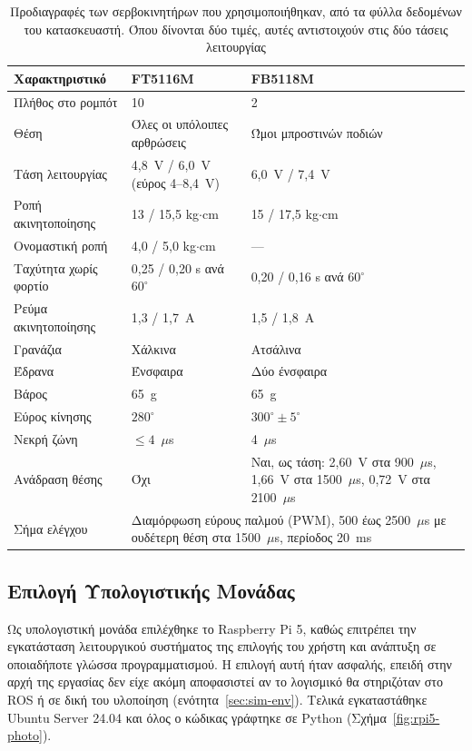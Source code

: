\documentclass[11pt]{report}
\begin{document}
\begin{table}[htbp]
    \centering
    \small
    \begin{tabular}{@{}p{4.3cm} p{4.4cm} p{4.4cm}@{}}
        \toprule
        Χαρακτηριστικό & FT5116M & FB5118M \\
        \midrule
        Πλήθος στο ρομπότ & 10 & 2 \\
        Θέση & Όλες οι υπόλοιπες αρθρώσεις & Ώμοι μπροστινών ποδιών \\
        Τάση λειτουργίας & 4,8~V / 6,0~V (εύρος 4--8,4~V) & 6,0~V / 7,4~V \\
        Ροπή ακινητοποίησης & 13 / 15,5 kg$\cdot$cm & 15 / 17,5 kg$\cdot$cm \\
        Ονομαστική ροπή & 4,0 / 5,0 kg$\cdot$cm & --- \\
        Ταχύτητα χωρίς φορτίο & 0,25 / 0,20 s ανά $60^\circ$ & 0,20 / 0,16 s ανά $60^\circ$ \\
        Ρεύμα ακινητοποίησης & 1,3 / 1,7~A & 1,5 / 1,8~A \\
        Γρανάζια & Χάλκινα & Ατσάλινα \\
        Έδρανα & Ένσφαιρα & Δύο ένσφαιρα \\
        Βάρος & 65~g & 65~g \\
        Εύρος κίνησης & $280^\circ$ & $300^\circ \pm 5^\circ$ \\
        Νεκρή ζώνη & $\leq 4$~$\mu$s & 4~$\mu$s \\
        Ανάδραση θέσης & Όχι & Ναι, ως τάση: 2,60~V στα 900~$\mu$s, 1,66~V στα 1500~$\mu$s, 0,72~V στα 2100~$\mu$s \\
        Σήμα ελέγχου & \multicolumn{2}{p{9.0cm}}{Διαμόρφωση εύρους παλμού (PWM), 500 έως 2500~$\mu$s με ουδέτερη θέση στα 1500~$\mu$s, περίοδος 20~ms} \\
        \bottomrule
    \end{tabular}
    \caption[Προδιαγραφές σερβοκινητήρων]{Προδιαγραφές των σερβοκινητήρων που
    χρησιμοποιήθηκαν, από τα φύλλα δεδομένων του κατασκευαστή. Όπου δίνονται δύο
    τιμές, αυτές αντιστοιχούν στις δύο τάσεις λειτουργίας}
    \label{tab:servo-specs}
\end{table}

\subsection{Επιλογή Υπολογιστικής Μονάδας}
Ως υπολογιστική μονάδα επιλέχθηκε το Raspberry Pi 5, καθώς επιτρέπει την
εγκατάσταση λειτουργικού συστήματος της επιλογής του χρήστη και ανάπτυξη σε
οποιαδήποτε γλώσσα προγραμματισμού. Η επιλογή αυτή ήταν ασφαλής, επειδή στην
αρχή της εργασίας δεν είχε ακόμη αποφασιστεί αν το λογισμικό θα στηριζόταν στο
ROS ή σε δική του υλοποίηση (ενότητα~\ref{sec:sim-env}). Τελικά εγκαταστάθηκε
Ubuntu Server 24.04 και όλος ο κώδικας γράφτηκε σε Python
(Σχήμα~\ref{fig:rpi5-photo}).
\end{document}
